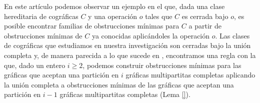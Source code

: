 En este artículo podemos observar un ejemplo en el que, dada
una clase hereditaria de cográficas $C$ y una operación
$o$ tales que $C$ es cerrada bajo $o$, es posible encontrar
familias de obstrucciones mínimas para $C$ a partir de
obstrucciones mínimas de $C$ ya conocidas aplic\'andoles
la operación $o$. Las clases de cográficas que estudiamos en
nuestra investigación son cerradas bajo la unión completa y,
de manera parecida a lo que sucede en \cite{Hell03},
encontramos una regla con la que, dado un entero $i \ge 2$,
podemos construir obstrucciones mínimas para las gráficas que
aceptan una partición en $i$ gráficas multipartitas completas
aplicando la unión completa a obstrucciones mínimas de las
gráficas que aceptan una partición en $i-1$ gráficas multipartitas
completas (Lema \ref{}).

